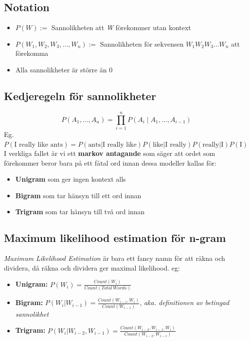 \documentclass[12pt,a4paper]{article}
\begin{document}
\noindent\hrulefill

\subsection*{Notation}
\begin{itemize}
    \item $P(W) :=$ Sannolikheten att \textit{W} förekommer utan kontext
    \item $P(W_1, W_2, W_3,...,W_n) :=$ Sannolikheten för sekvensen $W_1 W_2 W_3...W_n$ att förekomma
    \item Alla sannolikheter är större än 0
\end{itemize}

\noindent\hrulefill

\subsection*{Kedjeregeln för sannolikheter}
$$ P(A_1, \dots, A_n) = \prod_{i=1}^{n} P(A_i \mid A_1, \dots, A_{i-1}) $$
Eg. $P(\text{I really like ants}) = P(\text{ants} | \text{I really like})P(\text{like} | \text{I really})P(\text{really} | \text{I})P(\text{I})$
\newline
\newline
\newline
\newline
I verkliga fallet är vi ett \textbf{markov antagande} som säger att ordet som förekommer beror bara på ett fåtal ord innan dessa modeller kallas för:
\begin{itemize}
    \item \textbf{Unigram} som ger ingen kontext alls
    \item \textbf{Bigram} som tar hänsyn till ett ord innan
    \item \textbf{Trigram} som tar hänsyn till två ord innan
\end{itemize} 
\noindent\hrulefill

\subsection*{Maximum likelihood estimation för n-gram}
\textit{Maximum Likelihood Estimation} är bara ett fancy namn för att räkna och dividera, då räkna och dividera ger maximal likelihood. eg:

\begin{itemize}
    \item \textbf{Unigram:} {\large $ P(W_i) = \frac{Count(W_i)}{Count(Total \, Words)} $}
    \item \textbf{Bigram:} {\large $ P(W_i | W_{i-1}) = \frac{Count(W_{i-1}, W_i)}{Count(W_{i-1})} $}, \textit{aka. definitionen av betingad sannolikhet}
    \item \textbf{Trigram:} {\large $ P(W_i | W_{i-2}, W_{i-1}) = \frac{Count(W_{i-2}, W_{i-1}, W_i)}{Count(W_{i-2}, W_{i-1})} $}
\end{itemize}
\end{document}
